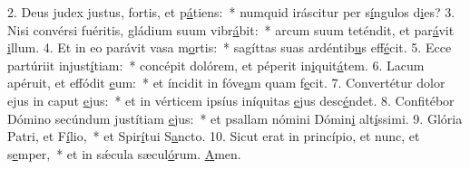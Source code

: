 2. Deus judex justus, fortis, et p\uline{á}tiens:~* numquid iráscitur per s\uline{í}ngulos d\uline{i}es?
3. Nisi convérsi fuéritis, gládium suum vibr\uline{á}bit:~* arcum suum teténdit, et par\uline{á}vit \uline{i}llum.
4. Et in eo parávit vasa m\uline{o}rtis:~* sagíttas suas ardéntib\uline{u}s eff\uline{é}cit.
5. Ecce partúriit injust\uline{í}tiam:~* concépit dolórem, et péperit in\uline{i}quit\uline{á}tem.
6. Lacum apéruit, et effódit \uline{e}um:~* et íncidit in fóve\uline{a}m quam f\uline{e}cit.
7. Convertétur dolor ejus in caput \uline{e}jus:~* et in vérticem ipsíus iníquitas \uline{e}jus desc\uline{é}ndet.
8. Confitébor Dómino secúndum justítiam \uline{e}jus:~* et psallam nómini Dómin\uline{i} alt\uline{í}ssimi.
9. Glória Patri, et F\uline{í}lio,~* et Spir\uline{í}tui S\uline{a}ncto.
10. Sicut erat in princípio, et nunc, et s\uline{e}mper,~* et in sǽcula sæcul\uline{ó}rum. \uline{A}men.
